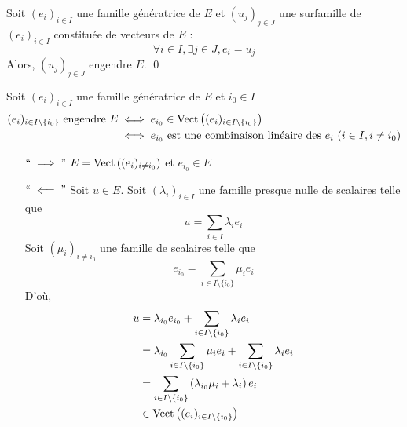 \begin{prop}
	Soit $(e_i)_{i\in I}$ une famille génératrice de $E$ et $(u_j)_{j\in J}$ une surfamille de $(e_i)_{i \in I}$ constituée de vecteurs de $E$ : \[
		\forall i \in I, \exists j \in J, e_i = u_j
	\]
	Alors, $(u_j)_{j\in J}$ engendre $E$. \qed
\end{prop}

\begin{prop}
	Soit $(e_i)_{i\in I}$ une famille génératrice de $E$ et $i_0 \in I$ \\
	\begin{align*}
		(e_i)_{i\in I \setminus \{i_0\}} \text{ engendre } E
		&\iff e_{i_0} \in \operatorname{Vect}\left( (e_i)_{i\in I\setminus \{i_0\} } \right) \\
		&\iff e_{i_0} \text{ est une combinaison linéaire des } e_i~(i\in I, i\neq i_0)
	\end{align*}
\end{prop}

\begin{prv}
	\begin{itemize}
		\item[$``\implies"$] $E = \operatorname{Vect}\left( (e_i)_{i \neq i_0} \right)$ et $e_{i_0} \in E$
		\item[$`` \impliedby"$] Soit $u \in E$. Soit $(\lambda_i)_{i\in I}$ une famille presque nulle de scalaires telle que \[
				u = \sum_{i \in I}\lambda_i e_i
			\]
			Soit $(\mu_i)_{i \neq i_0}$ une famille de scalaires telle que \[
				e_{i_0} = \sum_{i \in I \setminus \{i_0\}} \mu_i e_i
			\] D'où,
			\begin{align*}
				u &= \lambda_{i_0}e_{i_0} + \sum_{i \in I\setminus \{i_0\}} \lambda_i e_i\\
				&= \lambda_{i_0}\sum_{i \in I\setminus \{i_0\}}\mu_{i}e_{i} + \sum_{i \in I\setminus \{i_0\} }\lambda_i e_i \\
				&= \sum_{i \in I \setminus \{i_0\}} \left( \lambda_{i_0}\mu_i + \lambda_i \right)e_i  \\
				&\in \operatorname{Vect}\left( (e_i)_{i\in I\setminus \{i_0\} } \right) 
			\end{align*}
	\end{itemize}
\end{prv}


